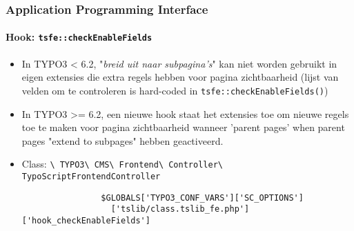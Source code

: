\begin{frame}[fragile]
	\frametitle{Application Programming Interface}
	\framesubtitle{Hook: \texttt{tsfe::checkEnableFields}}

	\begin{itemize}
		\item In TYPO3 < 6.2, "\emph{breid uit naar subpagina's}" kan niet worden gebruikt in eigen extensies die extra regels hebben voor pagina zichtbaarheid\newline
			\small(lijst van velden om te controleren is hard-coded in \texttt{tsfe::checkEnableFields()})\normalsize

		\item In TYPO3 >= 6.2, een nieuwe hook staat het extensies toe om nieuwe regels toe te maken voor pagina zichtbaarheid wanneer 'parent pages' when parent pages "extend to subpages" hebben geactiveerd.
		\item Class:\newline
			\smaller
				\texttt{\textbackslash
					TYPO3\textbackslash
					CMS\textbackslash
					Frontend\textbackslash
					Controller\textbackslash
					TypoScriptFrontendController}\normalsize

			\lstset{
				basicstyle=\smaller\ttfamily
			}

			\begin{lstlisting}
				$GLOBALS['TYPO3_CONF_VARS']['SC_OPTIONS']
				  ['tslib/class.tslib_fe.php']['hook_checkEnableFields']
			\end{lstlisting}

	\end{itemize}

\end{frame}


